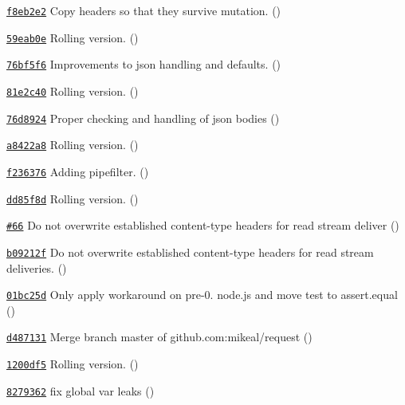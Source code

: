 \begin{DoxyItemize}
\item \href{https://github.com/mikeal/request/commit/f8eb2e229aca38547236d48066a0b3f9f8f67638}{\tt f8eb2e2} Copy headers so that they survive mutation. ()
\item \href{https://github.com/mikeal/request/commit/59eab0e5e49c6d32697822f712ed725843e70010}{\tt 59eab0e} Rolling version. ()
\item \href{https://github.com/mikeal/request/commit/76bf5f6c6e37f6cb972b3d4f1ac495a4ceaaa00d}{\tt 76bf5f6} Improvements to json handling and defaults. ()
\item \href{https://github.com/mikeal/request/commit/81e2c4040a9911a242148e1d4a482ac6c745d8eb}{\tt 81e2c40} Rolling version. ()
\item \href{https://github.com/mikeal/request/commit/76d8924cab295f80518a71d5903f1e815618414f}{\tt 76d8924} Proper checking and handling of json bodies ()
\item \href{https://github.com/mikeal/request/commit/a8422a80895ed70e3871c7826a51933a75c51b69}{\tt a8422a8} Rolling version. ()
\item \href{https://github.com/mikeal/request/commit/f2363760782c3d532900a86d383c34f3c94f6d5f}{\tt f236376} Adding pipefilter. ()
\item \href{https://github.com/mikeal/request/commit/dd85f8da969c2cc1825a7dfec6eac430de36440c}{\tt dd85f8d} Rolling version. ()
\item \href{https://github.com/mikeal/request/pull/66}{\tt \#66} Do not overwrite established content-\/type headers for read stream deliver ()
\item \href{https://github.com/mikeal/request/commit/b09212f38fe736c2c92a1ee076cae9d0f4c612c3}{\tt b09212f} Do not overwrite established content-\/type headers for read stream deliveries. ()
\item \href{https://github.com/mikeal/request/commit/01bc25d25343d73e9f5731b3d0df1cf5923398d4}{\tt 01bc25d} Only apply workaround on pre-\/0. node.\+js and move test to assert.\+equal ()
\item \href{https://github.com/mikeal/request/commit/d487131ebc2f7a4bf265061845f7f3ea2fd3ed34}{\tt d487131} Merge branch \textquotesingle{}master\textquotesingle{} of github.\+com\+:mikeal/request ()
\item \href{https://github.com/mikeal/request/commit/1200df52bd334f9a44a43846159146b8f938fd9e}{\tt 1200df5} Rolling version. ()
\item \href{https://github.com/mikeal/request/commit/82793626f6965884a3720d66f5a276d7d4d30873}{\tt 8279362} fix global var leaks ()

\end{DoxyItemize}
